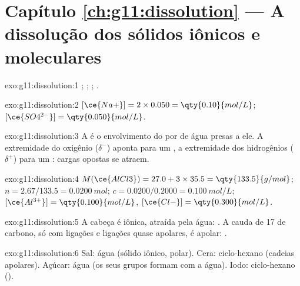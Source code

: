 \section*{Capítulo \ref{ch:g11:dissolution} --- A dissolução dos sólidos iônicos e moleculares}

\begin{solution}{exo:g11:dissolution:1}
;
;
;
.
\end{solution}

\begin{solution}{exo:g11:dissolution:2}
$[\ce{Na+}] = 2 \times 0.050 = \qty{0.10}{mol/L}$;
$[\ce{SO4^{2-}}] = \qty{0.050}{mol/L}$.
\end{solution}

\begin{solution}{exo:g11:dissolution:3}
A  é o envolvimento do  por  de água presas a ele.
A extremidade do oxigênio ($\delta^-$) aponta para um , a
extremidade dos hidrogênios ($\delta^+$) para um : cargas opostas
se atraem.
\end{solution}

\begin{solution}{exo:g11:dissolution:4}
$M(\ce{AlCl3}) = 27.0 + 3 \times 35.5 = \qty{133.5}{g/mol}$;
$n = 2.67 / 133.5 = \qty{0.0200}{mol}$; $c = 0.0200 / 0.2000 =
\qty{0.100}{mol/L}$; $[\ce{Al^{3+}}] = \qty{0.100}{mol/L}$,
$[\ce{Cl-}] = \qty{0.300}{mol/L}$.
\end{solution}

\begin{solution}{exo:g11:dissolution:5}
A cabeça  é iônica, atraída pela água: . A cauda de
17  de carbono, só com ligações  e ligações  quase
apolares, é apolar: .
\end{solution}

\begin{solution}{exo:g11:dissolution:6}
Sal: água (sólido iônico,  polar). Cera: ciclo-hexano (cadeias
apolares). Açúcar: água (os seus grupos  formam  com a água). Iodo: ciclo-hexano ().
\end{solution}

